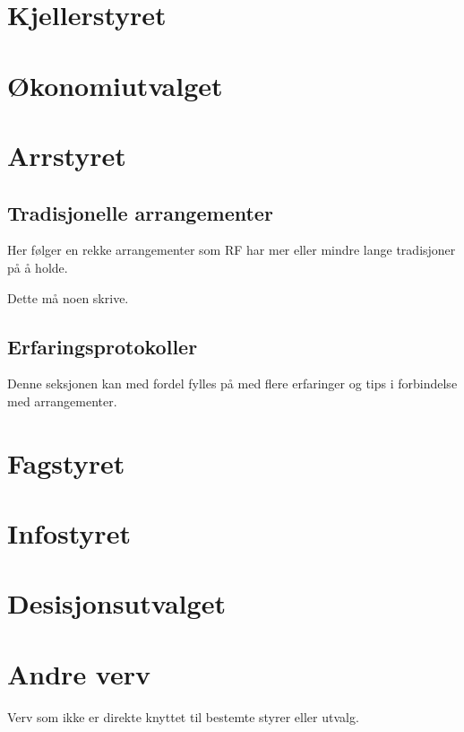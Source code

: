 \documentclass[11pt,norsk,a4paper,pointlessnumbers]{scrbook}
\begin{document}
\chapter{Kjellerstyret}




\chapter{Økonomiutvalget}


\chapter{Arrstyret}

\section{Tradisjonelle arrangementer}
Her følger en rekke arrangementer som RF har mer eller mindre lange
tradisjoner på å holde.

Dette må noen skrive.
%
%
%
%
%
%

\section{Erfaringsprotokoller}
Denne seksjonen kan med fordel fylles på med flere erfaringer og tips
i forbindelse med arrangementer.



\chapter{Fagstyret}


\chapter{Infostyret}



\chapter{Desisjonsutvalget}


\chapter{Andre verv}
Verv som ikke er direkte knyttet til bestemte styrer eller utvalg.


\end{document}
